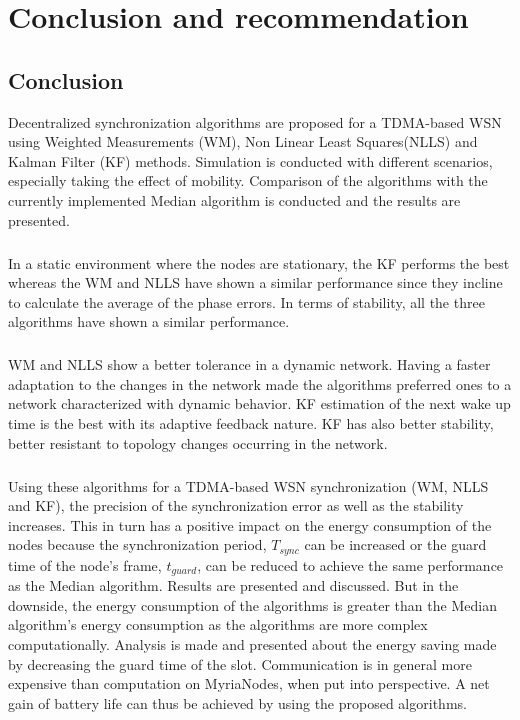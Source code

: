 \documentclass[a4paper,10pt]{report}
\begin{document}
\chapter{\textbf{Conclusion and recommendation}}
\section{\textbf{Conclusion}}
Decentralized synchronization algorithms are proposed for a TDMA-based WSN using Weighted Measurements (WM), Non Linear Least Squares(NLLS) and Kalman Filter (KF) methods. Simulation is conducted with different scenarios, especially taking the effect of mobility. Comparison of the algorithms with the currently implemented Median algorithm is conducted and the results are presented.
\paragraph*{}
In a static environment where the nodes are stationary, the KF performs the best whereas the WM and NLLS have shown a similar performance since they incline to calculate the average of the phase errors. In terms of stability, all the three algorithms have shown a similar performance.
\paragraph*{}
WM and NLLS show a better tolerance in a dynamic network. Having a
faster adaptation to the changes in the network made the algorithms
preferred ones to a network characterized with dynamic behavior. KF
estimation of the next wake up time is the best with its adaptive feedback nature. KF has also better stability, better
resistant to topology changes occurring in the network.
\paragraph*{}
Using these algorithms for a TDMA-based WSN synchronization (WM, NLLS and KF), the precision of the synchronization error as well as the stability increases. This in turn has a positive impact on the energy consumption of the nodes because the synchronization period, $T_{sync}$ can be increased or the guard time of the node's frame, $t_{guard}$, can be reduced to achieve the same performance as the Median algorithm. Results are presented and discussed. But in the downside, the energy consumption of the algorithms is greater than the Median algorithm's energy consumption as the algorithms are more complex computationally. Analysis is made and presented about the energy saving made by decreasing the guard time of the slot. Communication is in general more expensive than computation on MyriaNodes, when put into perspective. A net gain of battery life can thus be achieved by using the proposed algorithms.
\end{document}
